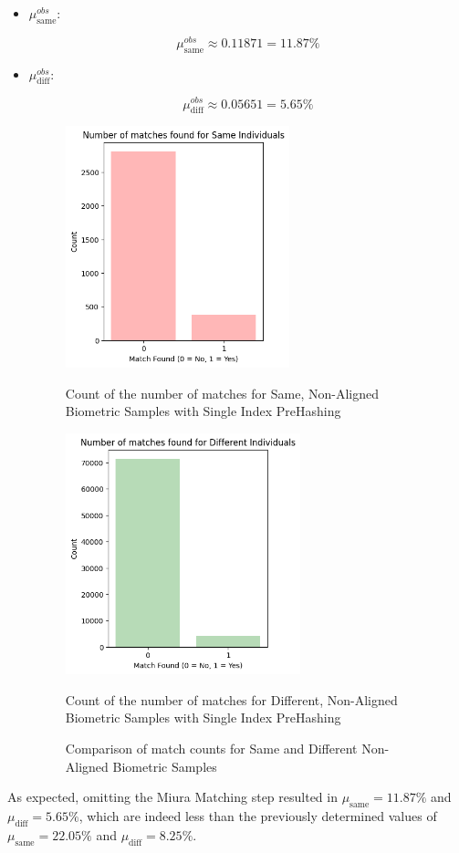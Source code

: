 \begin{itemize}
    \item \textbf{\(\mu_{\text{same}}^{obs}\)}: 
    
    \[ \mu_{\text{same}}^{obs} \approx 0.11871 = 11.87\%\]
    
    \item \textbf{\(\mu_{\text{diff}}^{obs}\)}:
    
    \[ \mu_{\text{diff}}^{obs} \approx 0.05651 = 5.65\% \]

    \begin{figure}[H]
        \centering
        \begin{minipage}[b]{0.48\linewidth}
            \centering
            \includegraphics[width=\linewidth,height=7cm,keepaspectratio]{latex-img/mu_same_without_postAlignment.png}
            \caption{Count of the number of matches for Same, Non-Aligned Biometric Samples with Single Index PreHashing}
            \label{mu_same_without_postAlignement}
        \end{minipage}
        \hfill
        \begin{minipage}[b]{0.48\linewidth}
            \centering
            \includegraphics[width=\linewidth,height=7cm,keepaspectratio]{latex-img/mu_diff_without_postAlignment.png}
            \caption{Count of the number of matches for Different, Non-Aligned Biometric Samples with Single Index PreHashing}
            \label{mu_diff_without_postAlignement}
        \end{minipage}
        \caption{Comparison of match counts for Same and Different Non-Aligned Biometric Samples}
    \end{figure}
\end{itemize}

As expected, omitting the Miura Matching step resulted in \(\mu_{\text{same}} = 11.87\%\) and \(\mu_{\text{diff}} = 5.65\%\), which are indeed less than the previously determined values of \(\mu_{\text{same}} = 22.05\%\) and \(\mu_{\text{diff}} = 8.25\%\).

